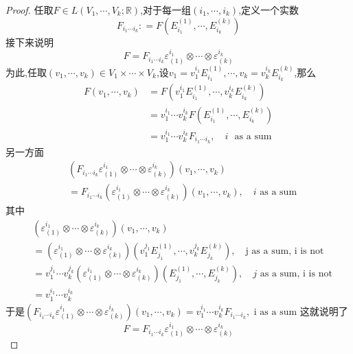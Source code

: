\documentclass[../../几何与拓扑.tex]{subfiles}
\begin{document}
\begin{proof}
    任取$F \in L\left( V_{1},{\cdots},V_{k};\mathbb{R} \right)$,对于每一组$\left( i_{1},{\cdots},i_{k} \right)$,定义一个实数 $$ F_{i_{1}{\cdots}i_{k}}: = F\left( E_{i_{1}}^{\left( 1 \right) },{\cdots},E_{i_{k}}^{\left( k \right) } \right)  $$接下来说明 $$ F= F_{i_{1}{\cdots}i_{k}}\varepsilon ^{i_{1}}_{\left( 1 \right) }\otimes {\cdots}\otimes \varepsilon ^{i_{k}}_{\left( k \right) } $$为此,任取$\left( v_{1},{\cdots},v_{k} \right)\in V_{1}\times{\cdots}\times V_{k}$,设$v_{1}=v_{1}^{i_{1}}E_{i_{1}}^{\left( 1 \right)},{\cdots},v_{k}= v_{k}^{i_{k}}E_{i_{k}}^{\left( k \right)}$,那么 $$\begin{aligned}  F\left( v_{1},{\cdots},v_{k} \right)  & =F\left( v_{1}^{i_{1}}E_{i_{1}}^{\left( 1 \right) } ,{\cdots},v_{k}^{i_{k}}E_{i_{k}}^{\left( k \right) }\right)  \\
        & =v_{1}^{i_{1}}{\cdots}v_{k}^{i_{k}}F\left( E_{i_{1}}^{\left( 1 \right) },{\cdots},E_{i_{k}}^{\left( k \right) } \right)  \\
        & = v_{1}^{i_{1}}{\cdots}v_{k}^{i_{k}}F_{i_{1}{\cdots}i_{k}},\quad i\text{ }\text{as a sum}\end{aligned}  $$另一方面 $$\begin{aligned} &  \left(  F_{i_{1}{\cdots}i_{k}}\varepsilon ^{i_{1}}_{\left( 1 \right) }\otimes {\cdots}\otimes \varepsilon ^{i_{k}}_{\left( k \right) } \right) \left( v_{1},{\cdots},v_{k} \right)  \\
        & = F_{i_{1}{\cdots}i_{k}}\left( \varepsilon ^{i_{1}}_{\left( 1 \right)}\otimes {\cdots}\otimes \varepsilon _{\left( k \right)}^{i_{k}} \right)\left( v_{1},{\cdots},v_{k} \right)   ,\quad  i\text{ as a sum}\end{aligned} $$其中 $$ \begin{aligned} &  \left( \varepsilon ^{i_{1}}_{\left( 1 \right) }\otimes {\cdots}\otimes \varepsilon ^{i_{k}}_{\left( k \right) } \right)\left( v_{1},{\cdots},v_{k} \right)   \\
       & = \left( \varepsilon ^{i_{1}}_{\left( 1 \right) }\otimes {\cdots}\otimes \varepsilon _{\left( k \right) }^{i_{k}} \right) \left( v_{1}^{j_{1}}E_{j_{1}}^{\left( 1 \right) },{\cdots},v_{k}^{j_{k}}E_{j_{k}}^{\left( k \right) } \right) ,\quad \text{j as a sum}\text{, i is not} \\
        & = v_{1}^{j_{1}}{\cdots}v_{k}^{j_{k}}\left( \varepsilon ^{i_{1}}_{\left( 1 \right) }\otimes {\cdots}\otimes \varepsilon _{\left( k \right) }^{i_{k}} \right) \left( E_{j_{1}}^{\left( 1 \right)  },{\cdots},E_{j_{k}}^{\left( k \right) } \right)  ,\quad  j\text{ as a sum, i is not} \\
        & =v_{1}^{i_{1}}{\cdots}v_{k}^{i_{k}}\end{aligned}  $$
       于是$\left( F_{i_{1}{\cdots}i_{k}}\varepsilon ^{i_{1}}_{\left( 1 \right)}\otimes{\cdots}\otimes \varepsilon ^{i_{k}}_{\left( k \right)} \right)\left( v_{1},{\cdots},v_{k} \right)=v_{1}^{i_{1}}{\cdots}v_{k}^{i_{k}}F_{i_{1}{\cdots}i_{k}},\text{ i as a sum}$
       这就说明了 $$ F= F_{i_{1}{\cdots}i_{k}}\varepsilon ^{i_{1}}_{\left( 1 \right) }\otimes {\cdots}\otimes \varepsilon ^{i_{k}}_{\left( k \right) } $$
       

\end{proof}
\end{document}
